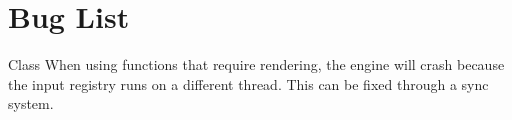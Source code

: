 \chapter{Bug List}
\hypertarget{bug}{}\label{bug}

\begin{DoxyRefList}
\item[Class \doxylink{class_atlas_1_1_input_registry}{Atlas\+::Input\+Registry} ]\label{bug__bug000001}%
%
When using functions that require rendering, the engine will crash because the input registry runs on a different thread. This can be fixed through a sync system. 
\end{DoxyRefList}